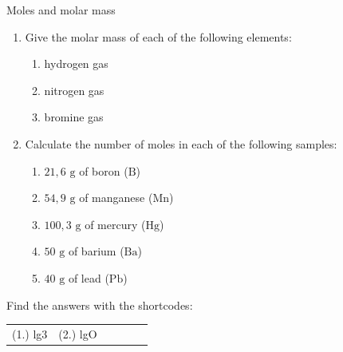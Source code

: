             \begin{exercises}{ Moles and molar mass
      }
            \nopagebreak \noindent
      \label{m38717*id277281}\begin{enumerate}[noitemsep, label=\textbf{\arabic*}. ] 
            \label{m38717*uid14}\item Give the molar mass of each of the following elements:
\label{m38717*id277295}\begin{enumerate}[noitemsep, label=\textbf{\alph*}. ] 
            \label{m38717*uid15}\item hydrogen gas
\label{m38717*uid16}\item nitrogen gas
\label{m38717*uid17}\item bromine gas
\end{enumerate}
                \label{m38717*uid18}\item Calculate the number of moles in each of the following samples:
\label{m38717*id277346}\begin{enumerate}[noitemsep, label=\textbf{\alph*}. ] 
            \label{m38717*uid19}\item $21,6 \text{ g}$ of boron ($\text{B}$)
\label{m38717*uid20}\item $54,9 \text{ g}$ of manganese ($\text{Mn}$)
\label{m38717*uid21}\item $100,3 \text{ g}$ of mercury ($\text{Hg}$)
\label{m38717*uid22}\item $50 \text{ g}$ of barium ($\text{Ba}$)
\label{m38717*uid23}\item $40 \text{ g}$ of lead ($\text{Pb}$)
\end{enumerate}
                \end{enumerate}
\practiceinfo
\par {} Find the answers with the shortcodes:
 \par \begin{tabular}[h]{cccccc}
 (1.) lg3  &  (2.) lgO  & \end{tabular}
\end{exercises}
